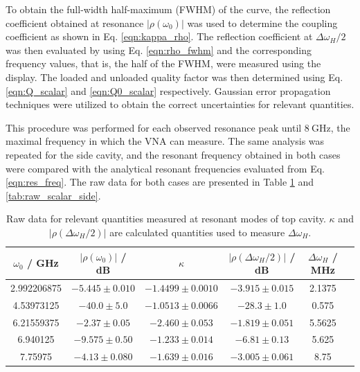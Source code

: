 \documentclass[a4paper]{report}
\numberwithin{equation}{section}
\begin{document}
To obtain the full-width half-maximum (FWHM) of the curve, the reflection
coefficient obtained at resonance $|\rho(\omega_0)|$ was used to determine the
coupling coefficient as shown in Eq. \ref{eqn:kappa_rho}. The reflection
coefficient at $\Delta\omega_H / 2$ was then evaluated by using Eq.
\ref{eqn:rho_fwhm} and the corresponding frequency values, that is, the half of the FWHM, were measured using
the display. The loaded and unloaded quality factor was then determined using Eq. \ref{eqn:Q_scalar} and
\ref{eqn:Q0_scalar} respectively. Gaussian error propagation techniques were
utilized to obtain the correct uncertainties for relevant quantities. \par 


This procedure was performed for each observed resonance peak until $\SI{8}{\giga\hertz}$, the
maximal frequency in which the VNA can measure. The same analysis was repeated
for the side cavity, and the resonant frequency obtained in both cases were
compared with the analytical resonant frequencies evaluated from Eq. \ref{eqn:res_freq}. The raw data
for both cases are presented in Table \ref{tab:raw_scalar_top} and \ref{tab:raw_scalar_side}. 

\begin{table}[htb!]
	\centering
	\begin{tabular}{|c|c|c|c|c|c|}
		\hline $\omega_0$ / GHz & $\left| \rho(\omega_0) \right|$ / dB & $\kappa$ & $\left| \rho(\Delta\omega_H / 2) \right|$ / dB & $\Delta\omega_H$ / MHz\\ 
		\hline 2.992206875 & $-5.445 \pm 0.010$ & $-1.4499 \pm 0.0010$ & $-3.915 \pm 0.015$ & 2.1375 \\ 
		\hline 4.53973125 & $-40.0 \pm 5.0$ & $-1.0513 \pm 0.0066$ & $-28.3 \pm 1.0$ & 0.575 \\
		\hline 6.21559375 & $-2.37 \pm 0.05$ & $ -2.460 \pm 0.053$ & $-1.819 \pm 0.051$ & 5.5625 \\
		\hline 6.940125 & $-9.575 \pm 0.50$ & $-1.233 \pm 0.014$ & $-6.81 \pm 0.13$ & 5.625 \\ 
		\hline 7.75975 & $-4.13 \pm 0.080$ & $-1.639 \pm 0.016$ & $-3.005 \pm 0.061$ & 8.75 \\ 
		\hline
	\end{tabular}
	
	\caption{Raw data for relevant quantities measured at resonant modes of top cavity. $\kappa$ and $\left| \rho(\Delta\omega_H / 2) \right|$ 
			are calculated quantities used to measure $\Delta\omega_H$. }
	\label{tab:raw_scalar_top}
\end{table}
\end{document}
